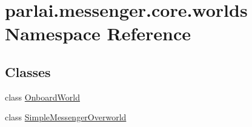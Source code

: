 \hypertarget{namespaceparlai_1_1messenger_1_1core_1_1worlds}{}\section{parlai.\+messenger.\+core.\+worlds Namespace Reference}
\label{namespaceparlai_1_1messenger_1_1core_1_1worlds}
\subsection*{Classes}
\begin{DoxyCompactItemize}
\item 
class \hyperlink{classparlai_1_1messenger_1_1core_1_1worlds_1_1OnboardWorld}{Onboard\+World}
\item 
class \hyperlink{classparlai_1_1messenger_1_1core_1_1worlds_1_1SimpleMessengerOverworld}{Simple\+Messenger\+Overworld}
\end{DoxyCompactItemize}
